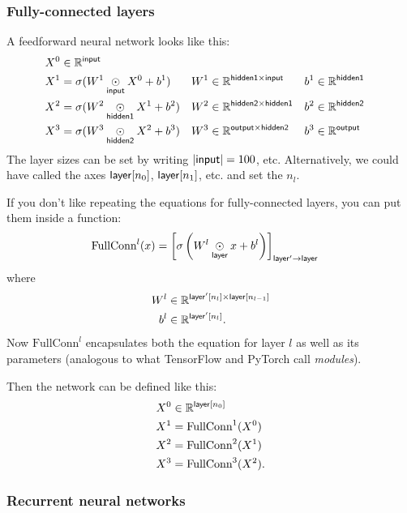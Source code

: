 \documentclass{article}
\begin{document}
\subsubsection{Fully-connected layers}

A feedforward neural network looks like this:
\begin{align*}
  X^0 &\in \mathbb{R}^{\name{input}} \\
  X^1 &= \sigma(W^1 \ndot{input} X^0 + b^1) & W^1 &\in \mathbb{R}^{\name{hidden1} \times \name{input}} & b^1 &\in \mathbb{R}^{\name{hidden1}} \\
  X^2 &= \sigma(W^2 \ndot{hidden1} X^1 + b^2) & W^2 &\in \mathbb{R}^{\name{hidden2} \times \name{hidden1}} & b^2 &\in \mathbb{R}^{\name{hidden2}} \\
  X^3 &= \sigma(W^3 \ndot{hidden2} X^2 + b^3) & W^3 &\in \mathbb{R}^{\name{output} \times \name{hidden2}} & b^3 &\in \mathbb{R}^{\name{output}}
\end{align*}
The layer sizes can be set by writing $|\name{input}| = 100$, etc. Alternatively, we could have called the axes $\name{layer}[n_0]$, $\name{layer}[n_1]$, etc. and set the $n_l$.

If you don't like repeating the equations for fully-connected layers, you can put them inside a function:
\begin{align*}
  \text{FullConn}^l(x) &= \nmov{layer'}{layer}{\sigma\left(W^l \ndot{layer} x + b^l\right)}
\end{align*}
where
\begin{align*}
  W^l &\in \mathbb{R}^{\nset{layer'}{n_{l}} \times \nset{layer}{n_{l-1}}} \\
  b^l &\in \mathbb{R}^{\nset{layer'}{n_l}}.
\end{align*}
Now $\text{FullConn}^l$ encapsulates both the equation for layer $l$ as well as its parameters (analogous to what TensorFlow and PyTorch call \emph{modules}).

Then the network can be defined like this:
\begin{align*}
  X^0 &\in \mathbb{R}^{\nset{layer}{n_0}} \\
  X^1 &= \text{FullConn}^1(X^0) \\
  X^2 &= \text{FullConn}^2(X^1) \\
  X^3 &= \text{FullConn}^3(X^2).
\end{align*}

\subsubsection{Recurrent neural networks}
\label{sec:rnn}
\end{document}
